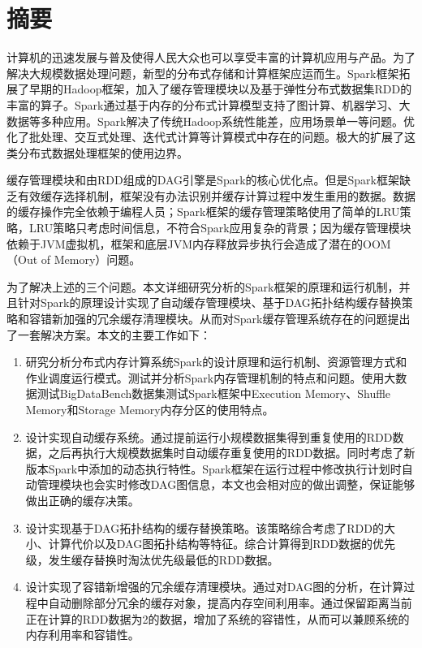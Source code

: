 \maketitle%
\MAKETITLE%
\makedeclaration%
\intobmk\chapter*{摘\quad 要}%
\setcounter{page}{1}%

计算机的迅速发展与普及使得人民大众也可以享受丰富的计算机应用与产品。为了解决大规模数据处理问题，新型的分布式存储和计算框架应运而生。Spark框架拓展了早期的Hadoop框架，加入了缓存管理模块以及基于弹性分布式数据集RDD的丰富的算子。Spark通过基于内存的分布式计算模型支持了图计算、机器学习、大数据等多种应用。Spark解决了传统Hadoop系统性能差，应用场景单一等问题。优化了批处理、交互式处理、迭代式计算等计算模式中存在的问题。极大的扩展了这类分布式数据处理框架的使用边界。

缓存管理模块和由RDD组成的DAG引擎是Spark的核心优化点。但是Spark框架缺乏有效缓存选择机制，框架没有办法识别并缓存计算过程中发生重用的数据。数据的缓存操作完全依赖于编程人员；Spark框架的缓存管理策略使用了简单的LRU策略，LRU策略只考虑时间信息，不符合Spark应用复杂的背景；因为缓存管理模块依赖于JVM虚拟机，框架和底层JVM内存释放异步执行会造成了潜在的OOM（Out of Memory）问题。

为了解决上述的三个问题。本文详细研究分析的Spark框架的原理和运行机制，并且针对Spark的原理设计实现了自动缓存管理模块、基于DAG拓扑结构缓存替换策略和容错新加强的冗余缓存清理模块。从而对Spark缓存管理系统存在的问题提出了一套解决方案。本文的主要工作如下：

\begin{enumerate}
    \item 研究分析分布式内存计算系统Spark的设计原理和运行机制、资源管理方式和作业调度运行模式。测试并分析Spark内存管理机制的特点和问题。使用大数据测试BigDataBench数据集测试Spark框架中Execution Memory、Shuffle Memory和Storage Memory内存分区的使用特点。
    \item 设计实现自动缓存系统。通过提前运行小规模数据集得到重复使用的RDD数据，之后再执行大规模数据集时自动缓存重复使用的RDD数据。同时考虑了新版本Spark中添加的动态执行特性。Spark框架在运行过程中修改执行计划时自动管理模块也会实时修改DAG图信息，本文也会相对应的做出调整，保证能够做出正确的缓存决策。
    \item 设计实现基于DAG拓扑结构的缓存替换策略。该策略综合考虑了RDD的大小、计算代价以及DAG图拓扑结构等特征。综合计算得到RDD数据的优先级，发生缓存替换时淘汰优先级最低的RDD数据。
    \item 设计实现了容错新增强的冗余缓存清理模块。通过对DAG图的分析，在计算过程中自动删除部分冗余的缓存对象，提高内存空间利用率。通过保留距离当前正在计算的RDD数据为2的数据，增加了系统的容错性，从而可以兼顾系统的内存利用率和容错性。
\end{enumerate}

